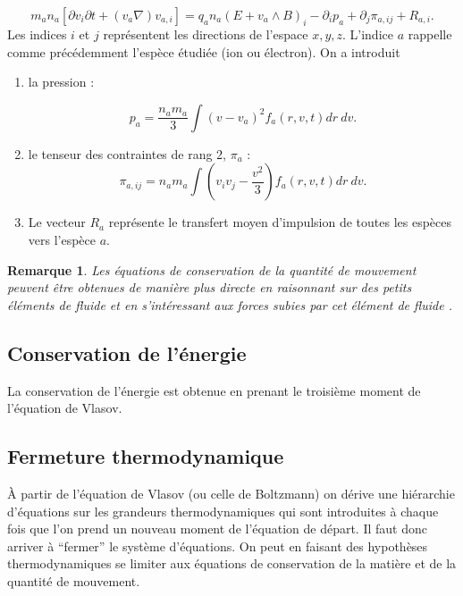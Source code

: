 \documentclass{book}
\newtheorem{rem}{Remarque}[chapter]
\begin{document}
\begin{equation}
m_an_a[\partial{v_i}{\partial t}+(v_a\nabla)v_{a,i}]=q_an_a (E+v_a
\wedge B)_i -\partial_i p_a + \partial_j\pi_{a,i j}+R_{a,i}. 
\end{equation}
Les indices $i$ et $j$ repr\'esentent les directions de
l'espace $x,y,z$. L'indice $a$ rappelle comme pr\'ec\'edemment l'esp\`ece
\'etudi\'ee (ion ou \'electron). 
On a introduit

\begin{enumerate}
\item la pression :

\begin{equation}
p_a=\frac{n_a m_a}{3}\int (v - v_a)^2f_a(r,v,t)d r\ d v.
\end{equation}

\item le tenseur des contraintes de rang 2, $\pi_a$ :
\begin{equation}
\pi_{a,i j}=n_a m_a\int (v_i v_j-\frac{v^2}{3})f_a(r,v,t)d r\ d v.
\end{equation}
\item Le vecteur $R_a$ repr\'esente le transfert moyen d'impulsion de
toutes les esp\`eces vers l'esp\`ece $a$.
\end{enumerate}

\begin{rem}
Les \'equations de conservation de la quantit\'e de mouvement peuvent
\^etre obtenues de mani\`ere plus directe en raisonnant 
sur des 
petits \'el\'ements de fluide et en s'int\'eressant aux forces subies par
cet \'el\'ement de fluide \cite{Chen84}.
\end{rem}


\subsection{Conservation de l'\'energie}

La conservation de l'\'energie 
 est obtenue en prenant le troisi\`eme
moment de l'\'equation de Vlasov.



\subsection{Fermeture thermodynamique}
\`A partir de l'\'equation de Vlasov
 (ou celle de Boltzmann) on d\'erive
une hi\'erarchie d'\'equations sur les grandeurs thermodynamiques qui
sont introduites \`a chaque fois que l'on prend un nouveau moment de
l'\'equation de d\'epart. Il faut donc arriver \`a ``fermer'' le
syst\`eme d'\'equations. On peut en faisant des hypoth\`eses
thermodynamiques se limiter aux 
\'equations de conservation 
 de la mati\`ere et de la quantit\'e de
mouvement.
\end{document}
